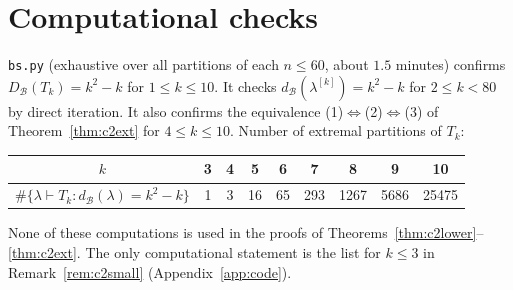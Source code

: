 \documentclass[11pt]{article}
\theoremstyle{definition}
\newcommand{\dB}{d_{\mathcal{B}}}
\newcommand{\DB}{D_{\mathcal{B}}}
\renewcommand{\le}{\leqslant}
\begin{document}
\section{Computational checks}
\texttt{bs.py} (exhaustive over all partitions of each $n\le60$, about $1.5$ minutes) confirms
$\DB(T_k)=k^2-k$ for $1\le k\le10$.  It checks $\dB(\lambda^{[k]})=k^2-k$ for $2\le k<80$ by direct
iteration.  It also confirms the equivalence (1)$\Leftrightarrow$(2)$\Leftrightarrow$(3) of
Theorem~\ref{thm:c2ext} for $4\le k\le10$.  Number of extremal partitions of $T_k$:
\begin{center}
\begin{tabular}{c|cccccccc}
$k$ & 3 & 4 & 5 & 6 & 7 & 8 & 9 & 10\\\hline
$\#\{\lambda\vdash T_k:\dB(\lambda)=k^2-k\}$ & 1 & 3 & 16 & 65 & 293 & 1267 & 5686 & 25475
\end{tabular}
\end{center}
None of these computations is used in the proofs of Theorems~\ref{thm:c2lower}--\ref{thm:c2ext}.  The only
computational statement is the list for $k\le3$ in Remark~\ref{rem:c2small} (Appendix~\ref{app:code}).

\appendix
\end{document}
